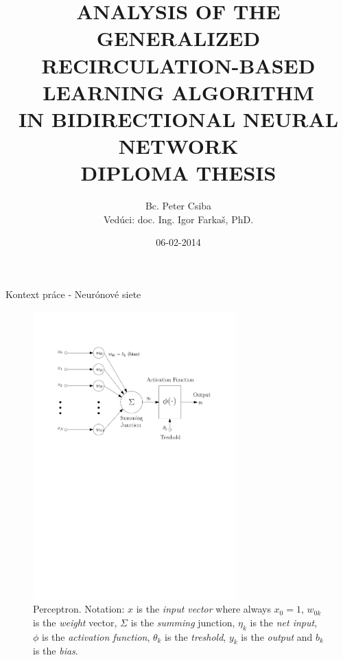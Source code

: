 \documentclass[xcolor=dvipsnames]{beamer}
\title[ANALYSIS OF A LEARNING ALGORITHM IN BIDIRECTIONAL NEURAL NETWORK]{
ANALYSIS OF THE GENERALIZED \\
RECIRCULATION-BASED LEARNING ALGORITHM \\
IN BIDIRECTIONAL NEURAL NETWORK \\
\vspace{3cm}
DIPLOMA THESIS
}
\author[P. Csiba]{Bc. Peter Csiba \\ Vedúci: doc. Ing. Igor Farkaš, PhD.}
\institute[FMFI UK]{
  UNIVERZITA KOMENSKÉHO V BRATISLAVE\\
  FAKULTA MATEMATIKY, FYZIKY A INFORMATIKY
}
\date{06-02-2014}
\begin{document}
\begin{frame}[plain]
  \titlepage
\end{frame}



\begin{frame}{Kontext práce - Neurónové siete}
 
\begin{figure}[h]
  \centering
  \includegraphics[width=0.7\textwidth]{img/perceptron.pdf}    
  \caption{Perceptron. Notation: $x$ is the \emph{input vector} where always $x_0=1$, $w_{0k}$ is the \emph{weight} vector, $\Sigma$ is the \emph{summing} junction, $\eta_k$ is the \emph{net input}, $\phi$ is the \emph{activation function}, $\theta_k$ is the \emph{treshold}, $y_k$ is the \emph{output} and $b_k$ is the \emph{bias}.} 
  \label{fig:perceptron}
\end{figure} 

\end{frame}
\end{document}
